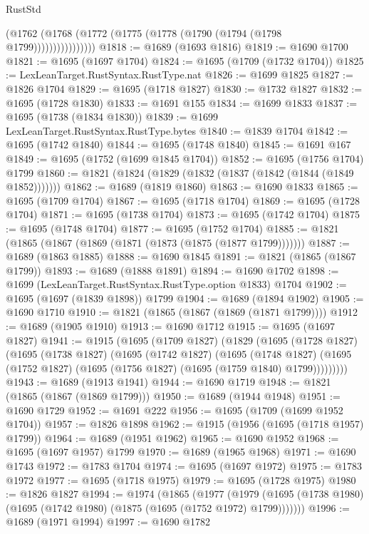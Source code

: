 \begin{lexlean}{RustStd}
\begin{coremodule}
                    (@1762 (@1768 (@1772 (@1775 (@1778 (@1790 (@1794 (@1798 @1799))))))))))))))))
@1818 := @1689 (@1693 @1816)
@1819 := @1690 @1700
@1821 := @1695 (@1697 @1704)
@1824 := @1695 (@1709 (@1732 @1704))
@1825 := LexLeanTarget.RustSyntax.RustType.nat
@1826 := @1699 @1825
@1827 := @1826 @1704
@1829 := @1695 (@1718 @1827)
@1830 := @1732 @1827
@1832 := @1695 (@1728 @1830)
@1833 := @1691 @155
@1834 := @1699 @1833
@1837 := @1695 (@1738 (@1834 @1830))
@1839 := @1699 LexLeanTarget.RustSyntax.RustType.bytes
@1840 := @1839 @1704
@1842 := @1695 (@1742 @1840)
@1844 := @1695 (@1748 @1840)
@1845 := @1691 @167
@1849 := @1695 (@1752 (@1699 @1845 @1704))
@1852 := @1695 (@1756 @1704) @1799
@1860 := @1821 (@1824 (@1829 (@1832 (@1837 (@1842 (@1844 (@1849 @1852)))))))
@1862 := @1689 (@1819 @1860)
@1863 := @1690 @1833
@1865 := @1695 (@1709 @1704)
@1867 := @1695 (@1718 @1704)
@1869 := @1695 (@1728 @1704)
@1871 := @1695 (@1738 @1704)
@1873 := @1695 (@1742 @1704)
@1875 := @1695 (@1748 @1704)
@1877 := @1695 (@1752 @1704)
@1885 := @1821 (@1865 (@1867 (@1869 (@1871 (@1873 (@1875 (@1877 @1799)))))))
@1887 := @1689 (@1863 @1885)
@1888 := @1690 @1845
@1891 := @1821 (@1865 (@1867 @1799))
@1893 := @1689 (@1888 @1891)
@1894 := @1690 @1702
@1898 := @1699 (LexLeanTarget.RustSyntax.RustType.option @1833) @1704
@1902 := @1695 (@1697 (@1839 @1898)) @1799
@1904 := @1689 (@1894 @1902)
@1905 := @1690 @1710
@1910 := @1821 (@1865 (@1867 (@1869 (@1871 @1799))))
@1912 := @1689 (@1905 @1910)
@1913 := @1690 @1712
@1915 := @1695 (@1697 @1827)
@1941 := @1915
    (@1695
      (@1709 @1827)
      (@1829
        (@1695
          (@1728 @1827)
          (@1695
            (@1738 @1827)
            (@1695
              (@1742 @1827)
              (@1695
                (@1748 @1827)
                (@1695 (@1752 @1827) (@1695 (@1756 @1827) (@1695 (@1759 @1840) @1799)))))))))
@1943 := @1689 (@1913 @1941)
@1944 := @1690 @1719
@1948 := @1821 (@1865 (@1867 (@1869 @1799)))
@1950 := @1689 (@1944 @1948)
@1951 := @1690 @1729
@1952 := @1691 @222
@1956 := @1695 (@1709 (@1699 @1952 @1704))
@1957 := @1826 @1898
@1962 := @1915 (@1956 (@1695 (@1718 @1957) @1799))
@1964 := @1689 (@1951 @1962)
@1965 := @1690 @1952
@1968 := @1695 (@1697 @1957) @1799
@1970 := @1689 (@1965 @1968)
@1971 := @1690 @1743
@1972 := @1783 @1704
@1974 := @1695 (@1697 @1972)
@1975 := @1783 @1972
@1977 := @1695 (@1718 @1975)
@1979 := @1695 (@1728 @1975)
@1980 := @1826 @1827
@1994 := @1974
    (@1865
      (@1977
        (@1979 (@1695 (@1738 @1980) (@1695 (@1742 @1980) (@1875 (@1695 (@1752 @1972) @1799)))))))
@1996 := @1689 (@1971 @1994)
@1997 := @1690 @1782

\end{coremodule}
\end{lexlean}

